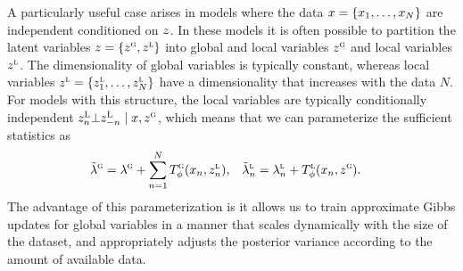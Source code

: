 \documentclass[anonymous=false, %
               format=acmsmall, %
               review=true, %
               screen=true, %
               nonacm=true]{acmart}
\theoremstyle{definition}
\begin{document}
A particularly useful case arises in models where the data $x = \{x_1, \ldots, x_N\}$ are independent conditioned on $z$. In these models it is often possible to partition the latent variables $z = \{z^\textsc{g}, z^\textsc{l}\}$ into global and local variables $z^{\textsc{g}}$ and local variables $z^{\textsc{l}}$. The dimensionality of global variables is typically constant, whereas local variables $z^\textsc{l} = \{z^\textsc{l}_1, \ldots, z^\textsc{l}_N\}$ have a dimensionality that increases with the data $N$. For models with this structure, the local variables are typically conditionally independent $z^\textsc{L}_n \bot z^\textsc{L}_{-n} \mid x, z^\textsc{g}$, which means that we can parameterize the sufficient statistics as
\begin{align*}
    \tilde{\lambda}^\textsc{g}
    &= 
    \lambda^\textsc{g} 
    + 
    \sum_{n=1}^N 
    T^\textsc{g}_\phi(x_n, z^\textsc{l}_{n}),
    &
    \tilde{\lambda}^\textsc{l}_n
    &=
    \lambda^\textsc{l}_n + T^\textsc{l}_\phi(x_n, z^\textsc{g}).
\end{align*}
The advantage of this parameterization is it allows us to train approximate Gibbs updates for global variables in a manner that scales dynamically with the size of the dataset, and appropriately adjusts the posterior variance according to the amount of available data.

 
\end{document}
